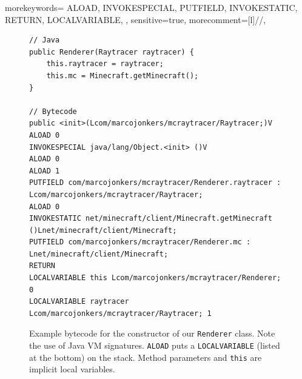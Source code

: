 \documentclass[]{article}
\begin{document}

{
  morekeywords={
    ALOAD,
    INVOKESPECIAL,
    PUTFIELD,
    INVOKESTATIC,
    RETURN,
    LOCALVARIABLE,
  },
  sensitive=true, %
  morecomment=[l]{//}, %
}
\begin{figure}
\begin{lstlisting}[breaklines,frame=single]
// Java
public Renderer(Raytracer raytracer) {
    this.raytracer = raytracer;
    this.mc = Minecraft.getMinecraft();
}

// Bytecode
public <init>(Lcom/marcojonkers/mcraytracer/Raytracer;)V
ALOAD 0
INVOKESPECIAL java/lang/Object.<init> ()V
ALOAD 0
ALOAD 1
PUTFIELD com/marcojonkers/mcraytracer/Renderer.raytracer : Lcom/marcojonkers/mcraytracer/Raytracer;
ALOAD 0
INVOKESTATIC net/minecraft/client/Minecraft.getMinecraft ()Lnet/minecraft/client/Minecraft;
PUTFIELD com/marcojonkers/mcraytracer/Renderer.mc : Lnet/minecraft/client/Minecraft;
RETURN
LOCALVARIABLE this Lcom/marcojonkers/mcraytracer/Renderer; 0
LOCALVARIABLE raytracer Lcom/marcojonkers/mcraytracer/Raytracer; 1
\end{lstlisting}
\caption[Example bytecode]{Example bytecode for the constructor of our \texttt{Renderer} class. Note the use of Java VM signatures. \texttt{ALOAD} puts a \texttt{LOCALVARIABLE} (listed at the bottom) on the stack. Method parameters and \texttt{this} are implicit local variables.}
\label{fig:bytecode}
\end{figure}
\end{document}
